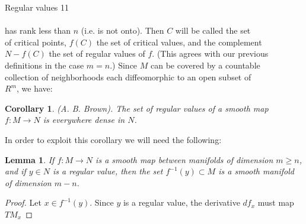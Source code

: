 \documentclass[12pt, openany, closeany]{book}
\newtheorem{lemma}{Lemma}
\theoremstyle{corollary}
\newtheorem*{corollary}{Corollary}
\begin{document}
  \newpage
  Regular values \hfill 11 \\ \\
  has rank less than $n$ (i.e. is not onto). Then $C$ will be called the set \\
  of critical points, $f(C)$ the set of critical values, and the complement \\
  $N - f(C)$ the set of regular values of $f$. (This agrees with our previous \\
  definitions in the case $m = n$.) Since $M$ can be covered by a countable \\
  collection of neighborhoods each diffeomorphic to an open subset of \\
  $R^m$, we have:
  \begin{corollary}
  (A. B. Brown). The set of regular values of a smooth map $f: M\to N$ is everywhere dense in $N$.
  \end{corollary}
  In order to exploit this corollary we will need the following:
  \begin{lemma}
  If $f: M\to N$ is a smooth map between manifolds of dimension $m\geq n$, and if $y\in N$ is a regular value, then the set $f^{-1}(y) \subset M$ is a smooth manifold of dimension $m - n$.
  \end{lemma}
  \begin{proof} Let $x\in f^{-1}(y)$. Since $y$ is a regular value, the derivative $df_{x}$ must map $TM_{x}$ 
  \end{proof}
  
\end{document}
